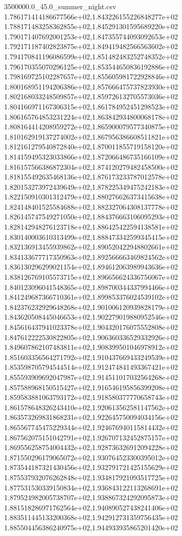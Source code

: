 \begin{filecontents*}{3500000.0_45.0_summer_night.csv}
1.786171414186677566e+02,1.843226155226848277e+02
1.788171483258362855e+02,1.845291301595689220e+02
1.790171407692001253e+02,1.847355744093092653e+02
1.792171187402823875e+02,1.849419482566563602e+02
1.794170841196086599e+02,1.851482483252748352e+02
1.796170355070296125e+02,1.853544650836192886e+02
1.798169725102287657e+02,1.855605981722928846e+02
1.800168951194206386e+02,1.857666475737823930e+02
1.802168033248509857e+02,1.859726132705573036e+02
1.804166971167306315e+02,1.861784952451298523e+02
1.806165764853231224e+02,1.863842934800068178e+02
1.808164414208959272e+02,1.865900079577340875e+02
1.810162919137274002e+02,1.867956386608511821e+02
1.812161279540872840e+02,1.870011855719158120e+02
1.814159495323033866e+02,1.872066486735166109e+02
1.816157566386872304e+02,1.874120279482458500e+02
1.818155492635468136e+02,1.876173233787012578e+02
1.820153273972439649e+02,1.878225349475242183e+02
1.822150910301312479e+02,1.880276626373415638e+02
1.824148401525584688e+02,1.882327064308137778e+02
1.826145747549271050e+02,1.884376663106095293e+02
1.828142948276123718e+02,1.886425422594138581e+02
1.830140003610313499e+02,1.888473342599345415e+02
1.832136913455939862e+02,1.890520422948802661e+02
1.834133677717350963e+02,1.892566663469824562e+02
1.836130296299021154e+02,1.894612063989943636e+02
1.838126769105573715e+02,1.896656624336756067e+02
1.840123096041548365e+02,1.898700344337994466e+02
1.841249687366710361e+02,1.899853376024539102e+02
1.842376232929648268e+02,1.901006120939828179e+02
1.843620508445046653e+02,1.902279019880952546e+02
1.845616437941023378e+02,1.904320176075552808e+02
1.847612222530822805e+02,1.906360336529332926e+02
1.849607862107483811e+02,1.908399501046978912e+02
1.851603356564271792e+02,1.910437669433249539e+02
1.853598705794544514e+02,1.912474841493367421e+02
1.855593909692047987e+02,1.914511017032564268e+02
1.857588968150515427e+02,1.916546195856399208e+02
1.859583881063793172e+02,1.918580377770658743e+02
1.861578648326243410e+02,1.920613562581147562e+02
1.863573269831868231e+02,1.922645750094034156e+02
1.865567745475229344e+02,1.924676940115814432e+02
1.867562075151042791e+02,1.926707132452875157e+02
1.869556258754004432e+02,1.928736326912094228e+02
1.871550296179065072e+02,1.930764523300395012e+02
1.873544187321430456e+02,1.932791721425155629e+02
1.875537932076262848e+02,1.934817921093517725e+02
1.877531530339150834e+02,1.936843122113268691e+02
1.879524982005738707e+02,1.938867324292095873e+02
1.881518286971762564e+02,1.940890527438241406e+02
1.883511445133200368e+02,1.942912731359756435e+02
1.885504456386240975e+02,1.944933935865201420e+02

\end{filecontents*}
